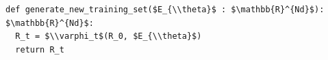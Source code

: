 \documentclass[border=10pt]{standalone}
\begin{document}
\begin{lstlisting}
def generate_new_training_set($E_{\\theta}$ : $\mathbb{R}^{Nd}$): $\mathbb{R}^{Nd}$:
  R_t = $\\varphi_t$(R_0, $E_{\\theta}$)
  return R_t
\end{lstlisting}
\end{document}
